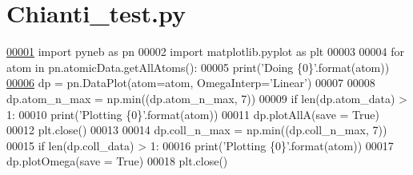 \hypertarget{_chianti__test_8py_source}{}\section{Chianti\+\_\+test.\+py}
\label{_chianti__test_8py_source}

\begin{DoxyCode}
\hypertarget{_chianti__test_8py_source_l00001}{}\hyperlink{namespacepyneb_1_1test_1_1_chianti__test}{00001} \textcolor{keyword}{import} pyneb \textcolor{keyword}{as} pn
00002 \textcolor{keyword}{import} matplotlib.pyplot \textcolor{keyword}{as} plt
00003 
00004 \textcolor{keywordflow}{for} atom \textcolor{keywordflow}{in} pn.atomicData.getAllAtoms():
00005     print(\textcolor{stringliteral}{'Doing \{0\}'}.format(atom))
\hypertarget{_chianti__test_8py_source_l00006}{}\hyperlink{namespacepyneb_1_1test_1_1_chianti__test_a19b19443ce67bd7f26c80fa05c0626ad}{00006}     dp = pn.DataPlot(atom=atom, OmegaInterp=\textcolor{stringliteral}{'Linear'})
00007     
00008     dp.atom\_n\_max = np.min((dp.atom\_n\_max, 7))
00009     \textcolor{keywordflow}{if} len(dp.atom\_data) > 1:
00010         print(\textcolor{stringliteral}{'Plotting \{0\}'}.format(atom))
00011         dp.plotAllA(save = \textcolor{keyword}{True})
00012         plt.close()
00013       
00014     dp.coll\_n\_max = np.min((dp.coll\_n\_max, 7))
00015     \textcolor{keywordflow}{if} len(dp.coll\_data) > 1:
00016         print(\textcolor{stringliteral}{'Plotting \{0\}'}.format(atom))
00017         dp.plotOmega(save = \textcolor{keyword}{True})
00018         plt.close()
\end{DoxyCode}
